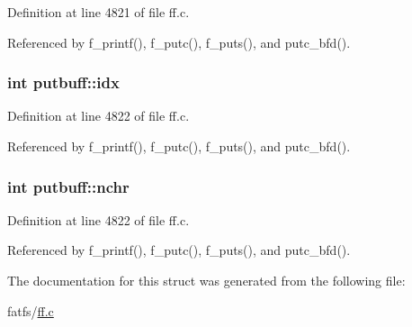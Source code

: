 Definition at line 4821 of file ff.\-c.



Referenced by f\-\_\-printf(), f\-\_\-putc(), f\-\_\-puts(), and putc\-\_\-bfd().

\hypertarget{structputbuff_a10a3ca93af8df07e9836ebd5230c06d8}{
\subsubsection[{idx}]{\setlength{\rightskip}{0pt plus 5cm}int putbuff\-::idx}}\label{structputbuff_a10a3ca93af8df07e9836ebd5230c06d8}


Definition at line 4822 of file ff.\-c.



Referenced by f\-\_\-printf(), f\-\_\-putc(), f\-\_\-puts(), and putc\-\_\-bfd().

\hypertarget{structputbuff_a125366bfe48077e6f562f95e30b4604a}{
\subsubsection[{nchr}]{\setlength{\rightskip}{0pt plus 5cm}int putbuff\-::nchr}}\label{structputbuff_a125366bfe48077e6f562f95e30b4604a}


Definition at line 4822 of file ff.\-c.



Referenced by f\-\_\-printf(), f\-\_\-putc(), f\-\_\-puts(), and putc\-\_\-bfd().



The documentation for this struct was generated from the following file\-:\begin{DoxyCompactItemize}
\item 
fatfs/\hyperlink{ff_8c}{ff.\-c}\end{DoxyCompactItemize}
